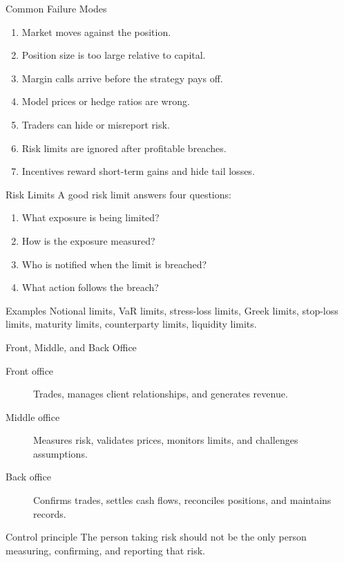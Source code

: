\documentclass[aspectratio=169,11pt]{beamer}
\begin{document}
\begin{frame}{Common Failure Modes}
    \begin{enumerate}
        \item Market moves against the position.
        \item Position size is too large relative to capital.
        \item Margin calls arrive before the strategy pays off.
        \item Model prices or hedge ratios are wrong.
        \item Traders can hide or misreport risk.
        \item Risk limits are ignored after profitable breaches.
        \item Incentives reward short-term gains and hide tail losses.
    \end{enumerate}
\end{frame}

\begin{frame}{Risk Limits}
    A good risk limit answers four questions:

    \begin{enumerate}
        \item What exposure is being limited?
        \item How is the exposure measured?
        \item Who is notified when the limit is breached?
        \item What action follows the breach?
    \end{enumerate}

    \begin{exampleblock}{Examples}
        Notional limits, VaR limits, stress-loss limits, Greek limits, stop-loss limits, maturity limits, counterparty limits, liquidity limits.
    \end{exampleblock}
\end{frame}

\begin{frame}{Front, Middle, and Back Office}
    \begin{description}
        \item[Front office] Trades, manages client relationships, and generates revenue.
        \item[Middle office] Measures risk, validates prices, monitors limits, and challenges assumptions.
        \item[Back office] Confirms trades, settles cash flows, reconciles positions, and maintains records.
    \end{description}

    \begin{alertblock}{Control principle}
        The person taking risk should not be the only person measuring, confirming, and reporting that risk.
    \end{alertblock}
\end{frame}
\end{document}
